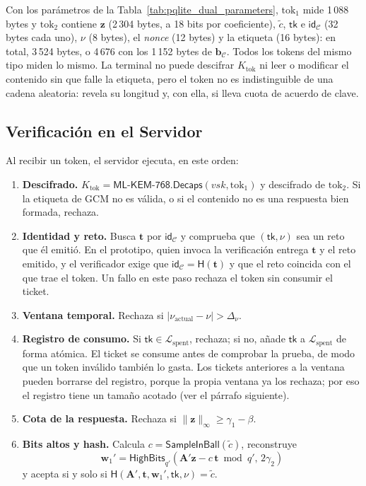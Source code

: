 Con los parámetros de la Tabla~\ref{tab:pqlite_dual_parameters}, $\text{tok}_1$ mide 1\,088 bytes y $\text{tok}_2$ contiene $\mathbf{z}$ (2\,304 bytes, a 18 bits por coeficiente), $\tilde{c}$, $\mathsf{tk}$ e $\mathsf{id}_{\mathcal{C}}$ (32 bytes cada uno), $\nu$ (8 bytes), el \textit{nonce} (12 bytes) y la etiqueta (16 bytes): en total, 3\,524 bytes, o 4\,676 con los 1\,152 bytes de $\mathbf{b}_{\mathcal{C}}$. Todos los tokens del mismo tipo miden lo mismo. La terminal no puede descifrar $K_{\text{tok}}$ ni leer o modificar el contenido sin que falle la etiqueta, pero el token no es indistinguible de una cadena aleatoria: revela su longitud y, con ella, si lleva cuota de acuerdo de clave.

\subsection{Verificación en el Servidor}
\label{sec:pqlite-verificacion}

Al recibir un token, el servidor ejecuta, en este orden:
\begin{enumerate}
    \item \textbf{Descifrado.} $K_{\text{tok}} = \mathsf{ML\text{-}KEM\text{-}768.Decaps}(vsk, \text{tok}_1)$ y descifrado de $\text{tok}_2$. Si la etiqueta de GCM no es válida, o si el contenido no es una respuesta bien formada, rechaza.
    \item \textbf{Identidad y reto.} Busca $\mathbf{t}$ por $\mathsf{id}_{\mathcal{C}}$ y comprueba que $(\mathsf{tk}, \nu)$ sea un reto que él emitió. En el prototipo, quien invoca la verificación entrega $\mathbf{t}$ y el reto emitido, y el verificador exige que $\mathsf{id}_{\mathcal{C}} = \mathsf{H}(\mathbf{t})$ y que el reto coincida con el que trae el token. Un fallo en este paso rechaza el token sin consumir el ticket.
    \item \textbf{Ventana temporal.} Rechaza si $|\nu_{\text{actual}} - \nu| > \Delta_\nu$.
    \item \textbf{Registro de consumo.} Si $\mathsf{tk} \in \mathcal{L}_{\text{spent}}$, rechaza; si no, añade $\mathsf{tk}$ a $\mathcal{L}_{\text{spent}}$ de forma atómica. El ticket se consume antes de comprobar la prueba, de modo que un token inválido también lo gasta. Los tickets anteriores a la ventana pueden borrarse del registro, porque la propia ventana ya los rechaza; por eso el registro tiene un tamaño acotado (ver el párrafo siguiente).
    \item \textbf{Cota de la respuesta.} Rechaza si $\|\mathbf{z}\|_\infty \ge \gamma_1 - \beta$.
    \item \textbf{Bits altos y hash.} Calcula $c = \mathsf{SampleInBall}(\tilde{c})$, reconstruye
    \begin{equation}
    \mathbf{w}_1' = \mathsf{HighBits}_{q'}\left(\mathbf{A}'\mathbf{z} - c\,\mathbf{t} \bmod q', \, 2\gamma_2\right)
    \end{equation}
    y acepta si y solo si $\mathsf{H}(\mathbf{A}', \mathbf{t}, \mathbf{w}_1', \mathsf{tk}, \nu) = \tilde{c}$.
\end{enumerate}

